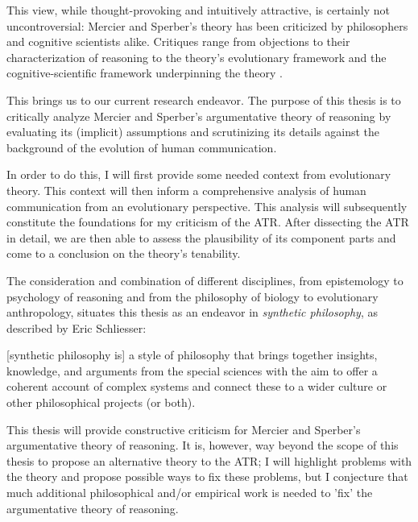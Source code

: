 This view, while thought-provoking and intuitively attractive, is certainly not uncontroversial: Mercier and Sperber's theory has been criticized by philosophers and cognitive scientists alike. Critiques range from objections to their characterization of reasoning \citep{Koren23} to the theory's evolutionary framework \citep{Novaes18} and the cognitive-scientific framework underpinning the theory \citep{Sterelny18, Chater18}.


This brings us to our current research endeavor.
The purpose of this thesis is to critically analyze Mercier and Sperber's argumentative theory of reasoning by evaluating its (implicit) assumptions and scrutinizing its details against the background of the evolution of human communication.

In order to do this, I will first provide some needed context from evolutionary theory. This context will then inform a comprehensive analysis of human communication from an evolutionary perspective. This analysis will subsequently constitute the foundations for my criticism of the ATR.
After dissecting the ATR in detail, we are then able to assess the plausibility of its component parts and come to a conclusion on the theory's tenability.

The consideration and combination of different disciplines, from epistemology to psychology of reasoning and from the philosophy of biology to evolutionary anthropology,
situates this thesis as an endeavor in \emph{synthetic philosophy}, as described by Eric Schliesser:
\begin{quoting}
    {[synthetic philosophy is]} a style of philosophy that brings together insights, knowledge, and arguments from the special sciences with the aim to offer a coherent account of complex systems and connect these to a wider culture or other philosophical projects (or both).
    \hfill \citep[pp.~1--2]{Schliesser19}
\end{quoting}

This thesis will provide constructive criticism for Mercier and Sperber's argumentative theory of reasoning. It is, however, way beyond the scope of this thesis to propose an alternative theory to the ATR; I will highlight problems with the theory and propose possible ways to fix these problems, but I conjecture that much additional philosophical and/or empirical work is needed to 'fix' the argumentative theory of reasoning.



